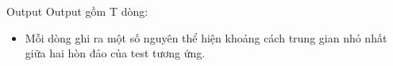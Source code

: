 Output
Output gồm T dòng:  
\begin{itemize}
	\item     Mỗi dòng ghi ra một số nguyên thể hiện khoảng cách trung gian nhỏ nhất giữa hai hòn đảo của test tương ứng.   
\end{itemize}